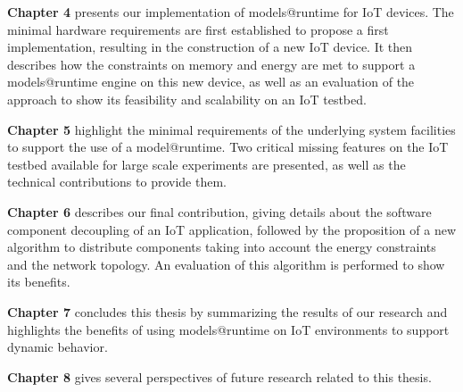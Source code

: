 \textbf{Chapter 4} presents our implementation of models@runtime for IoT devices.
The minimal hardware requirements are first established to propose a first implementation, resulting in the construction of a new IoT device.
It then describes how the constraints on memory and energy are met to support a models@runtime engine on this new device, as well as an evaluation of the approach to show its feasibility and scalability on an IoT testbed.

\textbf{Chapter 5} highlight the minimal requirements of the underlying system facilities to support the use of a model@runtime.
Two critical missing features on the IoT testbed available for large scale experiments are presented, as well as the technical contributions to provide them.

\textbf{Chapter 6} describes our final contribution, giving details about the software component decoupling of an IoT application, followed by the proposition of a new algorithm to distribute components taking into account the energy constraints and the network topology.
An evaluation of this algorithm is performed to show its benefits.

\textbf{Chapter 7} concludes this thesis by summarizing the results of our research and highlights the benefits of using models@runtime on IoT environments to support dynamic behavior.

\textbf{Chapter 8} gives several perspectives of future research related to this thesis.